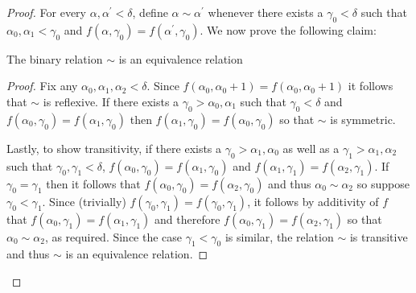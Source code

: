     \begin{proof}
        For every $\alpha,\alpha^\prime<\delta$, define $\alpha\sim\alpha^\prime$ whenever there exists a $\gamma_0<\delta$ such that $\alpha_0,\alpha_1<\gamma_0$ and $f(\alpha,\gamma_0)=f(\alpha^\prime,\gamma_0)$.  We now prove the following claim:
        \begin{claim}
            The binary relation $\sim$ is an equivalence relation
        \end{claim}
        \begin{proof}
            Fix any $\alpha_0,\alpha_1,\alpha_2<\delta$.  Since $f(\alpha_0,\alpha_0+1)=f(\alpha_0,\alpha_0+1)$ it follows that $\sim$ is reflexive.  If there exists a $\gamma_0>\alpha_0,\alpha_1$ such that $\gamma_0<\delta$ and $f(\alpha_0,\gamma_0)=f(\alpha_1,\gamma_0)$ then $f(\alpha_1,\gamma_0)=f(\alpha_0,\gamma_0)$ so that $\sim$ is symmetric.

            Lastly, to show transitivity, if there exists a $\gamma_0>\alpha_1,\alpha_0$ as well as a $\gamma_1>\alpha_1,\alpha_2$ such that $\gamma_0,\gamma_1<\delta$, $f(\alpha_0,\gamma_0)=f(\alpha_1,\gamma_0)$ and $f(\alpha_1,\gamma_1)=f(\alpha_2,\gamma_1)$. If $\gamma_0=\gamma_1$ then it follows that $f(\alpha_0,\gamma_0)=f(\alpha_2,\gamma_0)$ and thus $\alpha_0\sim\alpha_2$ so suppose $\gamma_0<\gamma_1$.  Since (trivially) $f(\gamma_0,\gamma_1)=f(\gamma_0,\gamma_1)$, it follows by additivity of $f$ that $f(\alpha_0,\gamma_1)=f(\alpha_1,\gamma_1)$ and therefore $f(\alpha_0,\gamma_1)=f(\alpha_2,\gamma_1)$ so that $\alpha_0\sim\alpha_2$, as required.  Since the case $\gamma_1<\gamma_0$ is similar, the relation $\sim$ is transitive and thus $\sim$ is an equivalence relation.
        \end{proof}


\end{proof}
